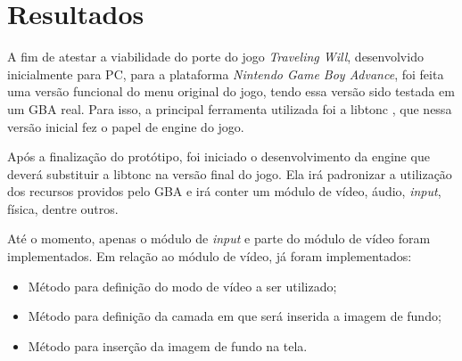 \chapter[Resultados]{Resultados}

A fim de atestar a viabilidade do porte do jogo \textit{Traveling Will}, desenvolvido inicialmente para PC, para a plataforma \textit{Nintendo Game Boy Advance}, foi feita uma versão funcional do menu original do jogo, tendo essa versão sido testada em um GBA real. Para isso, a principal ferramenta utilizada foi a libtonc \cite{libtonc}, que nessa versão inicial fez o papel de engine do jogo.

Após a finalização do protótipo, foi iniciado o desenvolvimento da engine que deverá substituir a libtonc na versão final do jogo. Ela irá padronizar a utilização dos recursos providos pelo GBA e irá conter um módulo de vídeo, áudio, \textit{input}, física, dentre outros.

Até o momento, apenas o módulo de \textit{input} e parte do módulo de vídeo foram implementados. Em relação ao módulo de vídeo, já foram implementados:

\begin{itemize}

\item Método para definição do modo de vídeo a ser utilizado;
\item Método para definição da camada em que será inserida a imagem de fundo;
\item Método para inserção da imagem de fundo na tela.

\end{itemize}
